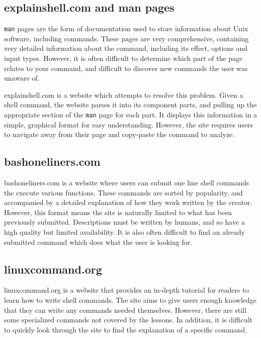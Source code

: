 \documentclass[11pt]{article}
\begin{document}
\subsection{explainshell.com and man pages}

\texttt{man} pages are the form of documentation used to store information about Unix software, including commands. These pages are very comprehensive, containing very detailed information about the command, including its effect, options and input types. However, it is often difficult to determine which part of the page relates to your command, and difficult to discover new commands the user was unaware of.

explainshell.com is a website which attempts to resolve this problem. Given a shell command, the website parses it into its component parts, and pulling up the appropriate section of the \texttt{man} page for each part. It displays this information in a simple, graphical format for easy understanding. However, the site requires users to navigate away from their page and copy-paste the command to analyze.

\subsection{bashoneliners.com}

bashoneliners.com is a website where users can submit one line shell commands the execute various functions. These commands are sorted by popularity, and accompanied by a detailed explanation of how they work written by the creator. However, this format means the site is naturally limited to what has been previously submitted. Descriptions must be written by humans, and so have a high quality but limited availability. It is also often difficult to find an already submitted command which does what the user is looking for.

\subsection{linuxcommand.org}

linuxcommand.org is a website that provides an in-depth tutorial for readers to learn how to write shell commands. The site aims to give users enough knowledge that they can write any commands needed themselves. However, there are still some specialized commands not covered by the lessons. In addition, it is difficult to quickly look through the site to find the explanation of a specific command.
\end{document}
